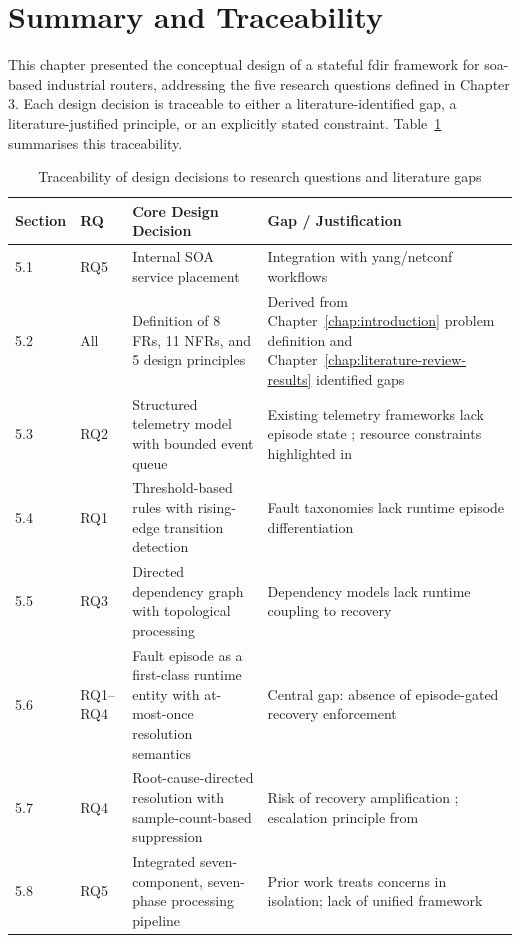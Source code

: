 \section{Summary and Traceability}\label{sec:conception-summary}

This chapter presented the conceptual design of a stateful \gls{fdir} framework for \gls{soa}-based industrial routers, addressing the five research questions defined in Chapter 3. Each design decision is traceable to either a literature-identified gap, a literature-justified principle, or an explicitly stated constraint. Table~\ref{tab:traceability} summarises this traceability.

\begin{table}[htbp]
\centering
\caption{Traceability of design decisions to research questions and literature gaps}
\label{tab:traceability}
\begin{tabular}{p{1.5cm} p{2cm} p{5.5cm} p{5.5cm}}
\toprule
Section & RQ & Core Design Decision & Gap / Justification \\
\midrule
5.1 & RQ5 & Internal SOA service placement & Integration with \gls{yang}/\gls{netconf} workflows \cite{ref15,ref21,ref29} \\
5.2 & All & Definition of 8 FRs, 11 NFRs, and 5 design principles & Derived from Chapter~\ref{chap:introduction} problem definition and Chapter~\ref{chap:literature-review-results} identified gaps \\
5.3 & RQ2 & Structured telemetry model with bounded event queue & Existing telemetry frameworks lack episode state \cite{ref13,ref14}; resource constraints highlighted in \cite{ref17} \\
5.4 & RQ1 & Threshold-based rules with rising-edge transition detection & Fault taxonomies lack runtime episode differentiation \cite{ref1,ref3,ref5} \\
5.5 & RQ3 & Directed dependency graph with topological processing & Dependency models lack runtime coupling to recovery \cite{ref7,ref8,ref9,ref10,ref11,ref12,ref27} \\
5.6 & RQ1--RQ4 & Fault episode as a first-class runtime entity with at-most-once resolution semantics & Central gap: absence of episode-gated recovery enforcement \cite{ref17,ref18,ref19,ref20,ref21,ref26} \\
5.7 & RQ4 & Root-cause-directed resolution with sample-count-based suppression & Risk of recovery amplification \cite{ref16}; escalation principle from \cite{ref2} \\
5.8 & RQ5 & Integrated seven-component, seven-phase processing pipeline & Prior work treats concerns in isolation; lack of unified framework \cite{ref5,ref6,ref29} \\
\bottomrule
\end{tabular}
\end{table}

